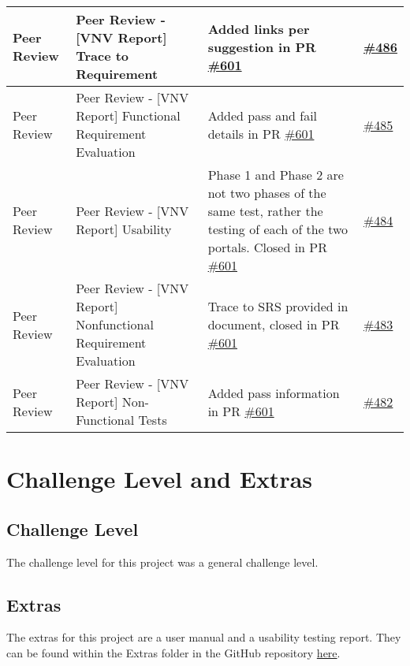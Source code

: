 \documentclass{article}
\begin{document}
\begin{longtable}{|m{3cm}|m{3cm}|m{5cm}|m{1cm}|}
  \hline
  Peer Review & Peer Review - [VNV Report] Trace to Requirement & Added links per suggestion in PR \href{https://github.com/Spitgranger/SyncMaster/pull/601}{\#601} 
  & \href{https://github.com/Spitgranger/SyncMaster/pull/486}{\#486}\\
  \hline
  Peer Review & Peer Review - [VNV Report] Functional Requirement Evaluation & Added pass and fail details in PR \href{https://github.com/Spitgranger/SyncMaster/pull/601}{\#601} 
  & \href{https://github.com/Spitgranger/SyncMaster/pull/485}{\#485}\\
  \hline
  Peer Review & Peer Review - [VNV Report] Usability & Phase 1 and Phase 2 are not two phases of the same test, 
  rather the testing of each of the two portals. Closed in PR \href{https://github.com/Spitgranger/SyncMaster/pull/601}{\#601} 
  & \href{https://github.com/Spitgranger/SyncMaster/pull/484}{\#484}\\
  \hline
  Peer Review & Peer Review - [VNV Report] Nonfunctional Requirement Evaluation & Trace to SRS provided in document,
  closed in PR \href{https://github.com/Spitgranger/SyncMaster/pull/601}{\#601} & \href{https://github.com/Spitgranger/SyncMaster/pull/483}{\#483}\\
  \hline
  Peer Review & Peer Review - [VNV Report] Non-Functional Tests & Added pass information in PR \href{https://github.com/Spitgranger/SyncMaster/pull/601}{\#601} 
  & \href{https://github.com/Spitgranger/SyncMaster/pull/482}{\#482}\\
  \hline
  \end{longtable}
\section{Challenge Level and Extras}

\subsection{Challenge Level}

The challenge level for this project was a general challenge level.

\subsection{Extras}

The extras for this project are a user manual and a usability testing report.
They can be found within the Extras folder in the GitHub repository 
\href{https://github.com/Spitgranger/SyncMaster/tree/main/docs/Extras}{here}.
\end{document}
